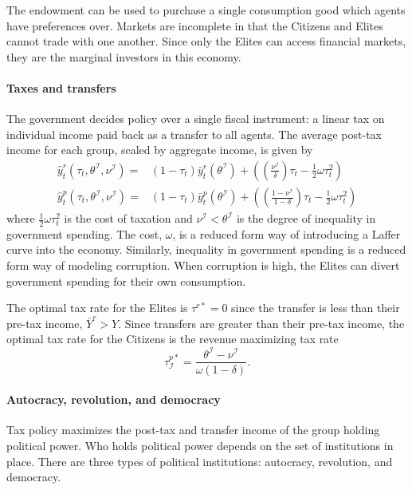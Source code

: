 \documentclass[12pt]{article}
\numberwithin{equation}{section}
\begin{document}
The endowment can be used to purchase a single consumption good which agents have \cite{Epstein1989} preferences over. Markets are incomplete in that the Citizens and Elites cannot trade with one another. Since only the Elites can access financial markets, they are the marginal investors in this economy.

\paragraph{Taxes and transfers}
The government decides policy over a single fiscal instrument: a linear tax on individual income paid back as a transfer to all agents. The average post-tax income for each group, scaled by aggregate income, is given by
\begin{align}
\hat{y}_{t}^{r} (\tau_{t},\theta^{\mathcal{I}},\nu^{\mathcal{I}}) = & (1-\tau_{t})\bar{y}_{t}^{r}(\theta^{\mathcal{I}})+\left(\left(\frac{\nu^{\mathcal{I}}}{\delta}\right)\tau_{t}-\frac{1}{2}\omega\tau_t^2\right) \\
\hat{y}_{t}^{p} (\tau_{t},\theta^{\mathcal{I}},\nu^{\mathcal{I}}) = & (1-\tau_{t})\bar{y}_{t}^{p}(\theta^{\mathcal{I}})+\left(\left(\frac{1-\nu^{\mathcal{I}}}{1-\delta}\right)\tau_{t}-\frac{1}{2}\omega\tau_t^2\right)
\end{align}
where $\frac{1}{2}\omega\tau_t^2$ is the cost of taxation and $\nu^{\mathcal{I}}<\theta^{\mathcal{I}}$ is the degree of inequality in government spending. The cost, $\omega$, is a reduced form way of introducing a Laffer curve into the economy. Similarly, inequality in government spending is a reduced form way of modeling corruption. When corruption is high, the Elites can divert government spending for their own consumption.

The optimal tax rate for the Elites is $\tau^{r*} = 0$ since the transfer is less than their pre-tax income, $\bar{Y}^{r}>Y$. Since transfers are greater than their pre-tax income, the optimal tax rate for the Citizens is the revenue maximizing tax rate
\begin{equation}
\tau^{p*}_\mathcal{I}=\frac{\theta^{\mathcal{I}}-\nu^{\mathcal{I}}}{\omega(1-\delta)}.
\end{equation}

\paragraph{Autocracy, revolution, and democracy}
Tax policy maximizes the post-tax and transfer income of the group holding political power. Who holds political power depends on the set of institutions in place. There are three types of political institutions: autocracy, revolution, and democracy. 
\end{document}
